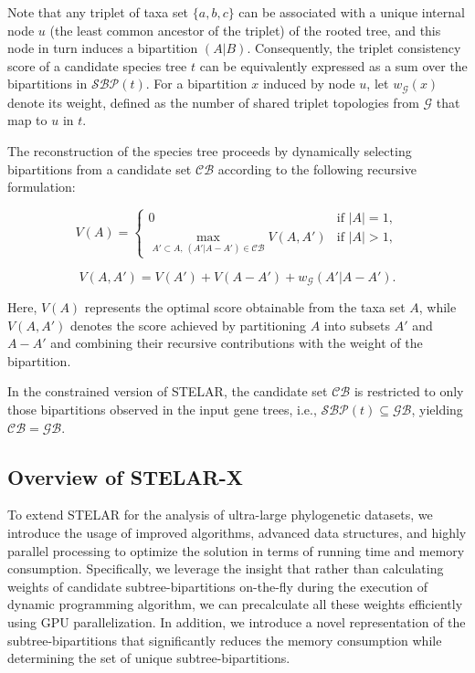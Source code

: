 \documentclass[runningheads]{llncs}
\begin{document}
Note that any triplet of taxa set $\{a,b,c\}$ can be associated with a unique internal node $u$ (the least common ancestor of the triplet) of the rooted tree, and this node in turn induces a bipartition $(A|B)$. Consequently, the triplet consistency score of a candidate species tree $t$ can be equivalently expressed as a sum over the bipartitions in $\mathcal{SBP}(t)$. For a bipartition $x$ induced by node $u$, let $w_{\mathcal{G}}(x)$ denote its weight, defined as the number of shared triplet topologies from $\mathcal{G}$ that map to $u$ in $t$.  

The reconstruction of the species tree proceeds by dynamically selecting bipartitions from a candidate set $\mathcal{CB}$ according to the following recursive formulation:  

\begin{equation}
V(A) = 
\begin{cases} 
0 & \text{if } |A| = 1, \\[6pt]
\max_{A' \subset A, \, (A'|A-A') \in \mathcal{CB}} V(A, A') & \text{if } |A| > 1,
\end{cases}
\label{eq:recurrence-relation}
\end{equation}

\begin{equation}
V(A, A') = V(A') + V(A - A') + w_{\mathcal{G}}(A'|A - A').
\end{equation}

Here, $V(A)$ represents the optimal score obtainable from the taxa set $A$, while $V(A, A')$ denotes the score achieved by partitioning $A$ into subsets $A'$ and $A-A'$ and combining their recursive contributions with the weight of the bipartition.  

In the constrained version of STELAR, the candidate set $\mathcal{CB}$ is restricted to only those bipartitions observed in the input gene trees, i.e., $\mathcal{SBP}(t) \subseteq \mathcal{GB}$, yielding $\mathcal{CB} = \mathcal{GB}$. 



\subsection{Overview of STELAR-X}

To extend STELAR for the analysis of ultra-large phylogenetic datasets, we introduce the usage of improved algorithms, advanced data structures, and highly parallel processing to optimize the solution in terms of running time and memory consumption. Specifically, we leverage the insight that rather than calculating weights of candidate subtree-bipartitions on-the-fly during the execution of dynamic programming algorithm, we can precalculate all these weights efficiently using GPU parallelization. In addition, we introduce a novel representation of the subtree-bipartitions that significantly reduces the memory consumption while determining the set of unique subtree-bipartitions.
\end{document}
